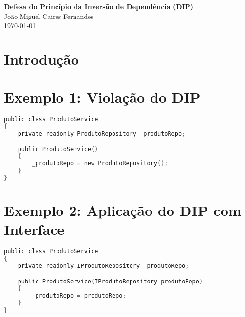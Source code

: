 \documentclass[12pt]{article}
\begin{document}
\begin{center}
    {\LARGE \textbf{Defesa do Princípio da Inversão de Dependência (DIP)}}\\[0.5cm]
    {\large João Miguel Caires Fernandes}\\
    {\large \today}
\end{center}

\vspace{1cm}

\section*{Introdução}


\vspace{0.5cm}

\section*{Exemplo 1: Violação do DIP}


\begin{lstlisting}[language=C,caption={Serviço acoplado à implementação concreta}]
public class ProdutoService
{
    private readonly ProdutoRepository _produtoRepo;

    public ProdutoService()
    {
        _produtoRepo = new ProdutoRepository();
    }
}
\end{lstlisting}

\vspace{0.5cm}

\section*{Exemplo 2: Aplicação do DIP com Interface}


\begin{lstlisting}[language=C,caption={Serviço desacoplado por meio de interface}]
public class ProdutoService
{
    private readonly IProdutoRepository _produtoRepo;

    public ProdutoService(IProdutoRepository produtoRepo)
    {
        _produtoRepo = produtoRepo;
    }
}
\end{lstlisting}
\end{document}
